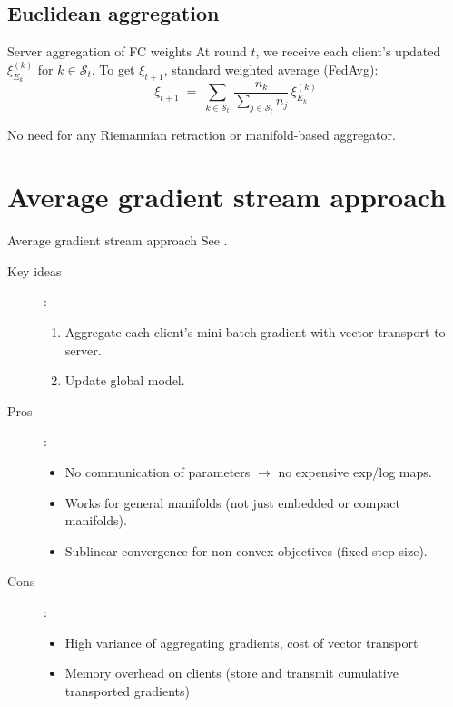 \documentclass[aspectratio=169,xcolor=dvipsnames]{beamer}
\begin{document}
\subsection{Euclidean aggregation}


\begin{frame}{Server aggregation of FC weights}
At round $t$, we receive each client’s updated $\xi_{E_k}^{(k)}$ for $k \in \mathcal{S}_t$.  
To get $\xi_{t+1}$,  standard weighted average (FedAvg):
\[
   \xi_{t+1}
   \;=\; \sum_{k\in \mathcal{S}_t} \, \frac{n_k}{\sum_{j\in \mathcal{S}_t}n_j}\,\xi_{E_k}^{(k)}
\]

\vspace{.5em}

No need for any Riemannian retraction or manifold-based aggregator.  
\end{frame}

\section{Average gradient stream approach}
\begin{frame}{Average gradient stream approach}
See \cite{huang2024riemannian}.
\begin{description}
\item[Key ideas]: 
\begin{enumerate}
\item Aggregate each client's mini-batch gradient with vector transport to server.
\item Update global model. 
\end{enumerate}
\item[Pros]:
\begin{itemize}
\item No communication of parameters $\to$ no expensive exp/log maps. 
\item Works for general manifolds (not just embedded or compact manifolds). 
\item Sublinear convergence for non-convex objectives (fixed step-size).
\end{itemize}
\item[Cons]:\begin{itemize}
\item High variance of aggregating gradients, cost of vector transport
\item Memory overhead on clients (store and transmit cumulative transported gradients)
\end{itemize}
\end{description}
\end{frame}
\end{document}
